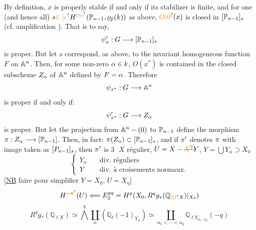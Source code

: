 By definition, $x$ is properly stable if and only if its stabilizer is finite, and for one (and hence all) $s\handwritten{\unsure{\in|\epsilon}}H^{\unsure{0|o}}(\handwritten{\mathbb{P}_{n-1}},\underline{o}_{\handwritten{\mathbb{P}}}(k))$ as above, $\unsure{O|0}(x)$ is closed in $[\mathbb{P}_{n-1}]_s$ (cf. amplification ). That is to say,
\[
\psi'_x:G\longrightarrow[\mathbb{P}_{n-1}]_s
\]
is proper. But let $s$ correspond, as above, to the invariant homogeneous function $F$ on $\mathbb{A}^n$. Then, for some non-zero $\alpha\in k$, $O(x^*)$ is contained in the closed subscheme $Z_{\alpha}$ of $\mathbb{A}^n$ defined by $F=\alpha$. Therefore
\[
\psi_{x^*}:G\longrightarrow\mathbb{A}^n
\]
is proper if and only if:
\[
\psi'_{x^*}:G\longrightarrow Z_{\alpha}
\]
is proper. But let the projection from $\mathbb{A}^n-(0)$ to $\mathbb{P}_{n-1}$ define the morphism $\pi:Z_{\alpha}\longrightarrow[\mathbb{P}_{n-1}]$. Then, in fact: $\pi(Z_{\alpha})\subset[\mathbb{P}_{n-1}]_s$, and if $\pi'$ denotes $\pi$ with image taken as $[P_{n-1}]_s$, then $\pi'$ is
\textcircled{3}
$X$ régulier, $U=X-\deleted{\unsure{X}}Y$, $Y=\bigcup Y_\alpha\supset X_0$
\[
\left\{\begin{aligned}
Y_\alpha&\quad\text{div. réguliers}\\
Y&\quad\text{div. à croisements normaux.}
\end{aligned}\right.
\]
[\uline{NB} faire pour simplifier $Y=X_0$, $U=X_\eta$]
\[
H^{\unsure{*|\bullet}}(U)\Longleftarrow E_2^{pq}=H^p(X_0,R^q g_*(\mathbb{Q}_{\unsure{\ell|l}X})\vert_{X_0})
\]
\[
R^q g_*(\mathbb{Q}_{\ell X})\simeq\mathop{\bigwedge}^{q}\coprod_\alpha(\mathbb{Q}_\ell(-1)_{Y_\alpha})\simeq\coprod_{\alpha_1<\cdots<\alpha_q}\mathbb{Q}_{\ell Y_{\alpha_1\cdots\alpha_q}}(-q)
\]
